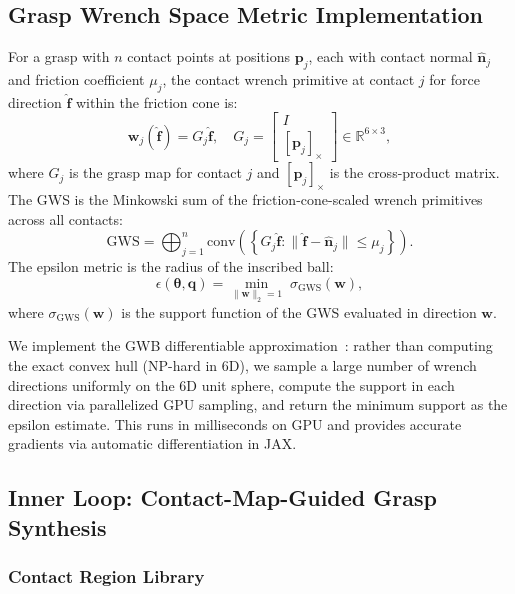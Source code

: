 \documentclass[journal]{IEEEtran}
\newcommand{\btheta}{\boldsymbol{\theta}}
\newcommand{\bq}{\mathbf{q}}
\newcommand{\bw}{\mathbf{w}}
\newcommand{\R}{\mathbb{R}}
\newcommand{\eps}{\epsilon}
\begin{document}
\subsection{Grasp Wrench Space Metric Implementation}

For a grasp with $n$ contact points at positions $\mathbf{p}_j$, each with contact
normal $\hat{\mathbf{n}}_j$ and friction coefficient $\mu_j$, the contact wrench
primitive at contact $j$ for force direction $\hat{\mathbf{f}}$ within the friction cone is:
\begin{equation}
  \bw_j(\hat{\mathbf{f}}) = G_j \hat{\mathbf{f}}, \quad
  G_j = \begin{bmatrix} I \\ [\mathbf{p}_j]_\times \end{bmatrix} \in \R^{6\times 3},
  \label{eq:wrench_primitive}
\end{equation}
where $G_j$ is the grasp map for contact $j$ and $[\mathbf{p}_j]_\times$ is the
cross-product matrix.
The GWS is the Minkowski sum of the friction-cone-scaled wrench primitives across all contacts:
\begin{equation}
  \text{GWS} = \bigoplus_{j=1}^n \mathrm{conv}\!\left(\left\{G_j \hat{\mathbf{f}} : \|\hat{\mathbf{f}} - \hat{\mathbf{n}}_j\| \leq \mu_j\right\}\right).
  \label{eq:gws}
\end{equation}
The epsilon metric is the radius of the inscribed ball:
\begin{equation}
  \eps(\btheta, \bq) = \min_{\|\bw\|_2 = 1}\; \sigma_{\text{GWS}}(\bw),
  \label{eq:eps}
\end{equation}
where $\sigma_{\text{GWS}}(\bw)$ is the support function of the GWS evaluated in direction $\bw$.

We implement the GWB differentiable approximation~\cite{gwb2023}: rather than computing
the exact convex hull (NP-hard in 6D), we sample a large number of wrench directions
uniformly on the 6D unit sphere, compute the support in each direction via parallelized
GPU sampling, and return the minimum support as the epsilon estimate.
This runs in milliseconds on GPU and provides accurate gradients via automatic
differentiation in JAX.

\subsection{Inner Loop: Contact-Map-Guided Grasp Synthesis}
\label{sec:inner}

\subsubsection{Contact Region Library}
\end{document}
